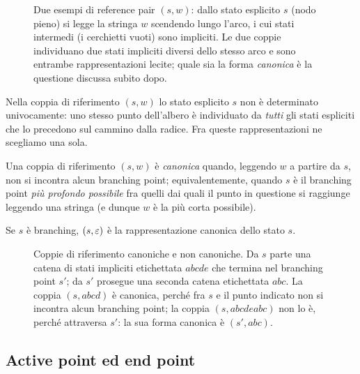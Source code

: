 \begin{figure}[H]
\centering

\caption{Due esempi di reference pair $(s,w)$: dallo stato esplicito $s$ (nodo pieno) si legge
la stringa $w$ scendendo lungo l'arco, i cui stati intermedi (i cerchietti vuoti) sono
impliciti. Le due coppie individuano due stati impliciti diversi dello stesso arco e sono
entrambe rappresentazioni lecite; quale sia la forma \emph{canonica} è la questione discussa
subito dopo.}
\label{fig:reference-pair}
\end{figure}

\noindent{}

Nella coppia di riferimento $(s,w)$ lo stato esplicito $s$ non è determinato univocamente: uno
stesso punto dell'albero è individuato da \emph{tutti} gli stati espliciti che lo precedono
sul cammino dalla radice. Fra queste rappresentazioni ne scegliamo una sola.

\begin{definizione}\label{def:coppia-canonica}
Una coppia di riferimento $(s,w)$ è \emph{canonica} quando, leggendo $w$ a partire da $s$, non
si incontra alcun branching point; equivalentemente, quando $s$ è il branching point
\emph{più profondo possibile} fra quelli dai quali il punto in questione si raggiunge leggendo
una stringa (e dunque $w$ è la più corta possibile).
\end{definizione}

\begin{osservazione}
Se $s$ è branching, $(s,\varepsilon)$ è la rappresentazione canonica dello stato $s$.
\end{osservazione}

\begin{figure}[H]
\centering

\caption{Coppie di riferimento canoniche e non canoniche. Da $s$ parte una catena di stati
impliciti etichettata $abcde$ che termina nel branching point $s'$; da $s'$ prosegue una
seconda catena etichettata $abc$. La coppia $(s,abcd)$ è canonica, perché fra $s$ e il punto
indicato non si incontra alcun branching point; la coppia $(s,abcdeabc)$ non lo è, perché
attraversa $s'$: la sua forma canonica è $(s',abc)$.}
\label{fig:coppia-canonica}
\end{figure}

\subsection{Active point ed end point}

